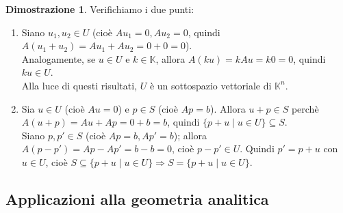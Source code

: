 \documentclass[a4paper]{article}
\theoremstyle{definition}
\newtheorem*{dimm}{Dimostrazione}
\begin{document}
	\begin{dimm}
		Verifichiamo i due punti:
		\begin{enumerate}
			\item Siano $u_1, u_2 \in U$ (cioè $Au_1 = 0, Au_2 = 0$, quindi $A(u_1 + u_2) = Au_1 + Au_2 = 0 + 0 = 0$). \\
			Analogamente, se $u \in U$ e $k \in \mathbb{K}$, allora $A(ku) = kAu = k0 = 0$, quindi $ku \in U$. \\
			Alla luce di questi risultati, $U$ è un sottospazio vettoriale di $\mathbb{K}^n$.
			\item Sia $u \in U$ (cioè $Au = 0$) e $p \in S$ (cioè $Ap = b$). Allora $u + p \in S$ perchè $A(u + p) = Au + Ap = 0 + b = b$,
			quindi $\{p + u \mid u \in U\} \subseteq S$. \\
			Siano $p, p' \in S$ (cioè $Ap = b, Ap' = b$); allora $A(p - p') = Ap - Ap' = b - b = 0$, cioè $p - p' \in U$.
			Quindi $p' = p + u$ con $u \in U$, cioè $S \subseteq \{p + u \mid u \in U\} \Rightarrow S = \{p + u \mid u \in U\}$.
		\end{enumerate}
	\end{dimm}
	\subsection{Applicazioni alla geometria analitica}
\end{document}

